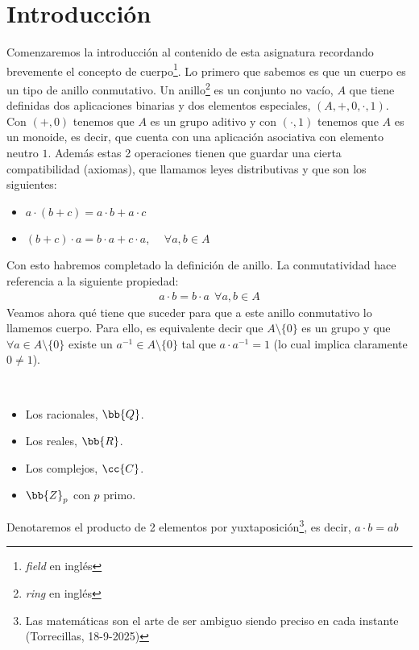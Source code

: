 \chapter*{Introducción}

Comenzaremos la introducción al contenido de esta asignatura recordando brevemente el concepto de cuerpo\footnote{\textit{field} en inglés}. Lo primero que sabemos es que un cuerpo es un tipo de anillo conmutativo. Un anillo\footnote{\textit{ring} en inglés} es un conjunto no vacío, $A$ que tiene definidas dos aplicaciones binarias y dos elementos especiales, $(A, +, 0, \cdot, 1)$. Con $(+,0)$ tenemos que $A$ es un grupo aditivo y con $(\cdot, 1)$ tenemos que $A$ es un monoide, es decir, que cuenta con una aplicación asociativa con elemento neutro $1$. Además estas 2 operaciones tienen que guardar una cierta compatibilidad (axiomas), que llamamos leyes distributivas y que son los siguientes:
\begin{itemize}
    \item $a\cdot(b+c) = a\cdot b + a \cdot c$
    \item $(b+c)\cdot a = b\cdot a + c \cdot a$, \ \ $\forall a,b\in A$
\end{itemize}
Con esto habremos completado la definición de anillo. La conmutatividad hace referencia a la siguiente propiedad:
\begin{gather*}
    a\cdot b = b \cdot a  \ \ \forall a,b\in A
\end{gather*}
Veamos ahora qué tiene que suceder para que a este anillo conmutativo lo llamemos cuerpo. Para ello, es equivalente decir que $A\setminus \{0\}$ es un grupo y que $\forall a \in A\setminus\{0\}$ existe un $a^{-1}\in A\setminus \{0\}$ tal que $a\cdot a^{-1} = 1$ (lo cual implica claramente $0\neq 1$).

\begin{ejemplo}\
    \begin{itemize}
        \item Los racionales, $\bb{Q}$.
        \item Los reales, $\bb{R}$.
        \item Los complejos, $\cc{C}$.
        \item $\bb{Z}_p$ con $p$ primo.
    \end{itemize}
\end{ejemplo}

\begin{notacion}
    Denotaremos el producto de 2 elementos por yuxtaposición\footnote{Las matemáticas son el arte de ser ambiguo siendo preciso en cada instante (Torrecillas, 18-9-2025)}, es decir, $a\cdot b = ab$
\end{notacion}


